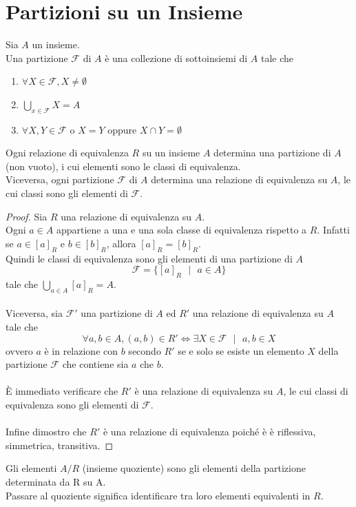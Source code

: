 \documentclass[a4paper,12pt, oneside]{book}
\begin{document}
	\section{Partizioni su un Insieme}
	\begin{definizione}
		Sia $A$ un insieme.\\
		Una partizione $\mathcal{F}$ di $A$ è una collezione di sottoinsiemi di $A$ tale che \begin{enumerate}
			\item $\forall X \in \mathcal{F}, X \not = \emptyset$
			\item $\displaystyle\bigcup_{x \in \mathcal{F}} X = A$
			\item $\forall X,Y \in \mathcal{F} \mbox{ o } X=Y \mbox{ oppure } X \cap Y = \emptyset$
		\end{enumerate}
	\end{definizione}
	\begin{teorema}
		Ogni relazione di equivalenza $R$ su un insieme $A$ determina una partizione di $A$ (non vuoto), i cui elementi sono le classi di equivalenza.\\
		Viceversa, ogni partizione $\mathcal{F}$ di $A$ determina una relazione di equivalenza su $A$, le cui classi sono gli elementi di $\mathcal{F}$.
		\begin{proof}
			Sia $R$ una relazione di equivalenza su $A$.\\
			Ogni $a \in A$ appartiene a una e una sola classe di equivalenza rispetto a $R$. Infatti se $a \in [a]_{R}$ e $b \in [b]_{R}$, allora $[a]_{R} = [b]_{R}$.\\
			Quindi le classi di equivalenza sono gli elementi di una partizione di $A$
			$$\mathcal{F} = \{[a]_{R} \mbox{  } | \mbox{  } a \in A\}$$
			tale che $\displaystyle\bigcup_{a \in A} [a]_{R} = A$.\\\\
			Viceversa, sia $\mathcal{F}'$ una partizione di $A$ ed $R'$ una relazione di equivalenza su $A$ tale che
			$$\forall a,b \in A, (a,b) \in R' \iff \exists X \in \mathcal{F} \mbox{  } | \mbox{ } a,b \in X$$
			ovvero $a$ è in relazione con $b$ secondo $R'$ se e solo se esiste un elemento $X$ della partizione $\mathcal{F}$ che contiene sia $a$ che $b$.\\\\
			È immediato verificare che $R'$ è una relazione di equivalenza su $A$, le cui classi di equivalenza sono gli elementi di $\mathcal{F}$.\\\\
			Infine dimostro che $R'$ è una relazione di equivalenza poiché è è riflessiva, simmetrica, transitiva.
		\end{proof}
	\end{teorema}
	\begin{nota}
		Gli elementi $A/R$ (insieme quoziente) sono gli elementi della partizione determinata da R su A.\\Passare al quoziente significa identificare tra loro elementi equivalenti in $R$.
	\end{nota}
	
\end{document}
